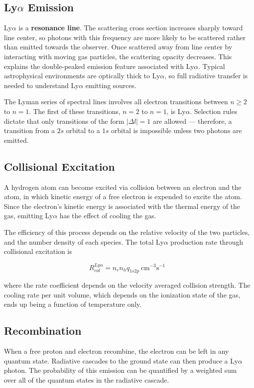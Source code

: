 \documentclass[onecolumn]{aastex63}
\begin{document}
\subsection{Ly$\alpha$ Emission}
Ly$\alpha$ is a \textbf{resonance line}. The scattering cross section increases sharply toward line center, so photons with this frequency are more likely to be scattered rather than emitted towards the observer. Once scattered away from line center by interacting with moving gas particles, the scattering opacity decreases. This explains the double-peaked emission feature associated with Ly$\alpha$. Typical astrophysical environments are optically thick to Ly$\alpha$, so full radiative transfer is needed to understand Ly$\alpha$ emitting sources.

The Lyman series of spectral lines involves all electron transitions between $n \ge 2$ to $n = 1$. The first of these transitions, $n = 2$ to $n = 1$, is Ly$\alpha$. Selection rules dictate that only transitions of the form $|\Delta l| = 1$ are allowed --- therefore, a transition from a $2s$ orbital to a $1s$ orbital is impossible unless two photons are emitted.

\subsection{Collisional Excitation} A hydrogen atom can become excited via collision between an electron and the atom, in which kinetic energy of a free electron is expended to excite the atom. Since the electron's kinetic energy is associated with the thermal energy of the gas, emitting Ly$\alpha$ has the effect of cooling the gas.

The efficiency of this process depends on the relative velocity of the two particles, and the number density of each species. The total Ly$\alpha$ production rate through collisional excitation is 

\begin{equation}
    R_{col}^{Ly\alpha} = n_e n_h q_{1s2p}\ \textrm{cm}^{-3} \textrm{s}^{-1}
\end{equation}

where the rate coefficient depends on the velocity averaged collision strength. The cooling rate per unit volume, which depends on the ionization state of the gas, ends up being a function of temperature only.

\subsection{Recombination} When a free proton and electron recombine, the electron can be left in any quantum state. Radiative cascades to the ground state can then produce a Ly$\alpha$ photon. The probability of this emission can be quantified by a weighted sum over all of the quantum states in the radiative cascade.
\end{document}
